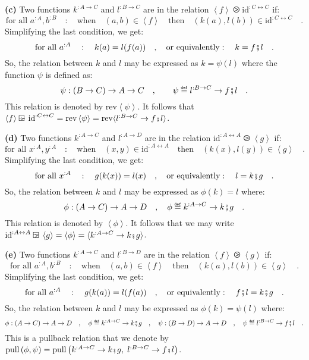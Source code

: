 \textbf{(c)} Two functions $k^{:A\rightarrow C}$ and $l^{:B\rightarrow C}$
are in the relation $\left<f\right>\ogreaterthan\text{id}^{:C\leftrightarrow C}$
if:
\[
\text{for all }a^{:A},b^{:B}\quad:\quad\text{when}\quad(a,b)\in\left<f\right>\quad\text{then}\quad(k(a),l(b))\in\text{id}^{:C\leftrightarrow C}\quad.
\]
Simplifying the last condition, we get:
\[
\text{for all }a^{:A}\quad:\quad k(a)=l(f(a))\quad,\quad\text{or equivalently}:\quad k=f\bef l\quad.
\]
So, the relation between $k$ and $l$ may be expressed as $k=\psi(l)$
where the function $\psi$ is defined as:
\[
\psi:\left(B\rightarrow C\right)\rightarrow A\rightarrow C\quad,\quad\quad\psi\triangleq l^{:B\rightarrow C}\rightarrow f\bef l\quad.
\]
This relation is denoted by $\text{rev}\left<\psi\right>$. It follows
that $\left<f\right>\ogreaterthan\text{id}^{:C\leftrightarrow C}=\text{rev}\left<\psi\right>=\text{rev}\langle l^{:B\rightarrow C}\rightarrow f\bef l\rangle$.

\textbf{(d)} Two functions $k^{:A\rightarrow C}$ and $l^{:A\rightarrow D}$
are in the relation $\text{id}^{:A\leftrightarrow A}\ogreaterthan\left<g\right>$
if:
\[
\text{for all }x^{:A},y^{:A}\quad:\quad\text{when}\quad(x,y)\in\text{id}^{:A\leftrightarrow A}\quad\text{then}\quad(k(x),l(y))\in\left<g\right>\quad.
\]
Simplifying the last condition, we get:
\[
\text{for all }x^{:A}\quad:\quad g(k(x))=l(x)\quad,\quad\text{or equivalently}:\quad l=k\bef g\quad.
\]
So, the relation between $k$ and $l$ may be expressed as $\phi(k)=l$
where:
\[
\phi:\left(A\rightarrow C\right)\rightarrow A\rightarrow D\quad,\quad\phi\triangleq k^{:A\rightarrow C}\rightarrow k\bef g\quad.
\]
This relation is denoted by $\left<\phi\right>$. It follows that
we may write $\text{id}^{:A\leftrightarrow A}\ogreaterthan\left<g\right>=\left<\phi\right>=\langle k^{:A\rightarrow C}\rightarrow k\bef g\rangle$.

\textbf{(e)} Two functions $k^{:A\rightarrow C}$ and $l^{:B\rightarrow D}$
are in the relation $\left<f\right>\ogreaterthan\left<g\right>$ if:
\[
\text{for all }a^{:A},b^{:B}\quad:\quad\text{when}\quad(a,b)\in\left<f\right>\quad\text{then}\quad(k(a),l(b))\in\left<g\right>\quad.
\]
Simplifying the last condition, we get:
\[
\text{for all }a^{:A}\quad:\quad g(k(a))=l(f(a))\quad,\quad\text{or equivalently}:\quad f\bef l=k\bef g\quad.
\]
So, the relation between $k$ and $l$ may be expressed as $\phi(k)=\psi(l)$
where: 
\[
\phi:\left(A\rightarrow C\right)\rightarrow A\rightarrow D\quad,\quad\phi\triangleq k^{:A\rightarrow C}\rightarrow k\bef g\quad,\quad\psi:\left(B\rightarrow D\right)\rightarrow A\rightarrow D\quad,\quad\psi\triangleq l^{:B\rightarrow C}\rightarrow f\bef l\quad.
\]
 This is a pullback relation that we denote by $\text{pull}\,(\phi,\psi)=\text{pull}\,\big(k^{:A\rightarrow C}\rightarrow k\bef g,\;l^{:B\rightarrow C}\rightarrow f\bef l\big)$.

